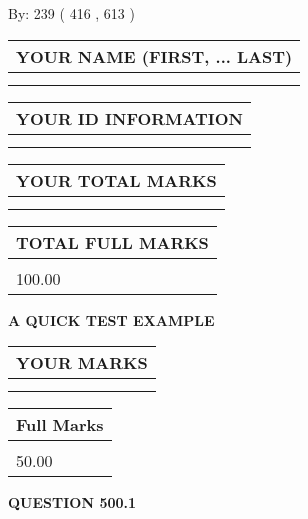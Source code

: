 \documentclass[12pt]{article}
\begin{document}
   
\hspace{1.0in} By: 
 239 ( 416 ,  613 )
   
   
   
   
\newpage 
\setcounter{page}{ 
   500001 } 
   
   
   
   
\noindent\begin{tabular}{|l|}
\hline
YOUR NAME (FIRST, ... LAST)  \\
\hline
 \\ 
 \\ 
\hline
\end{tabular}
\hspace{0.05in} \begin{tabular}{|l|}
\hline
 YOUR   ID   INFORMATION  \\
\hline
 \\ 
 \\ 
\hline
\end{tabular}
   
   
\vspace{0.2in}\noindent\begin{tabular}{|l|}
\hline
YOUR TOTAL MARKS  \\
\hline
 \\ 
 \\ 
\hline
\end{tabular}
\hspace{0.05in} \begin{tabular}{|l|}
\hline
TOTAL FULL MARKS  \\
\hline
 \\ 
100.00 \\
\hline
\end{tabular}
   
   
 \vspace{0.2in}
{\LARGE {\textbf{ A QUICK TEST EXAMPLE}}}
   
   
  
\vspace{0.2in}
  
\noindent\begin{tabular}{|l|}
\hline
 YOUR MARKS  \\
\hline
 \\ 
 \\ 
\hline
\end{tabular}
\hspace{0.05in} \begin{tabular}{|l|}
\hline
 Full Marks  \\
\hline
 \\ 
50.00 \\
\hline
\end{tabular}
{\textbf{\Large{QUESTION
500.1 
}}}
  
\end{document}
